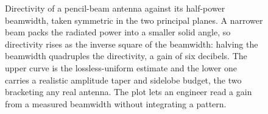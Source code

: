 \begin{figure}[htbp]
\centering
{}
\caption[Directivity against half-power beamwidth]{Directivity of a
pencil-beam antenna against its half-power beamwidth, taken symmetric in
the two principal planes. A narrower beam packs the radiated power into a
smaller solid angle, so directivity rises as the inverse square of the
beamwidth: halving the beamwidth quadruples the directivity, a gain of
six decibels. The upper curve is the lossless-uniform estimate and the
lower one carries a realistic amplitude taper and sidelobe budget, the
two bracketing any real antenna. The plot lets an engineer read a gain
from a measured beamwidth without integrating a pattern.}
\label{fig:vol04ch10:directivity-beamwidth}
\end{figure}

